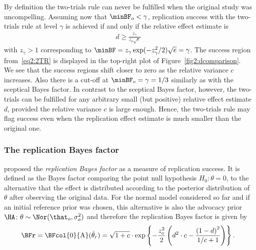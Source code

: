 By definition the two-trials rule can never be fulfilled when the original study
was uncompelling. Assuming now that $\minBF_{o} < \gamma$, replication success
with the two-trials rule at level $\gamma$ is achieved if and only if the
relative effect estimate is
\begin{align}
  \label{eq2:2TR}
  d \geq \frac{z_{\gamma}}{z_{o} \sqrt{c}}
\end{align}
with $z_{\gamma} > 1$ corresponding to
$\minBF = z_{\gamma}\exp(-z_{\gamma}^{2}/2)\sqrt{e} = \gamma$. The success
region from~\eqref{eq2:2TR} is displayed in the top-right plot of
Figure~\ref{fig2:dcomparison}. We see that the success regions shift closer to
zero as the relative variance $c$ increases. Also there is a cut-off at
$\minBF_{o} = \gamma = 1/3$ similarly as with the sceptical Bayes factor. In
contrast to the sceptical Bayes factor, however, the two-trials can be fulfilled
for any arbitrary small (but positive) relative effect estimate $d$, provided
the relative variance $c$ is large enough. Hence, the two-trials rule may flag
success even when the replication effect estimate is much smaller than the
original one.

\subsubsection{The replication Bayes factor}
\citet{Verhagen2014} proposed the \emph{replication Bayes factor} as a measure
of replication success. It is defined as the Bayes factor comparing the point
null hypothesis $H_0 \colon \theta = 0$, to the alternative that the effect is
distributed according to the posterior distribution of $\theta$ after observing
the original data. For the normal model considered so far and if an initial
reference prior was chosen, this alternative is also the advocacy prior
$\HA \colon \theta \sim \Nor(\that_o, \sigma^2_o)$ and therefore the replication
Bayes factor is given by
\begin{align}
  \label{eq2:BFrep}
  \BFr
  = \BFcol{\mathrm{0}}{\mathrm{A}}(\hat{\theta}_r)
  = \sqrt{1 + c} \cdot
  \exp\left\{-\frac{z_o^2}{2} \left(d^2 \cdot c -
  \frac{\left(1 - d\right)^2}{1/c + 1} \right)\right\}.
\end{align}

